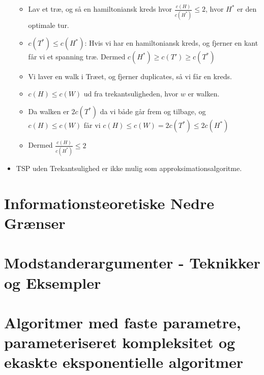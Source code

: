 \begin{itemize}
\begin{itemize}
		      \item Lav et træ, og så en hamiltoniansk kreds hvor $\frac{c(H)}{c(H^{*})} \le 2$, hvor $H^{*}$ er den optimale tur.
		      \item $c(T^{*}) \le c(H^{*})$: Hvis vi har en hamiltoniansk kreds, og fjerner en kant får vi et spanning træ. Dermed $c(H^{*}) \ge c(T') \ge c(T^{*})$
		      \item Vi laver en walk i Træet, og fjerner duplicates, så vi får en kreds.
		      \item $c(H) \le c(W)$ ud fra trekantsuligheden, hvor $w$ er walken.
		      \item Da walken er $2c(T^{*})$ da vi både går frem og tilbage, og $c(H) \le c(W)$ får vi $c(H) \le c(W) = 2c(T^{*}) \le 2c(H^{*})$
		      \item Dermed $\frac{c(H)}{c(H^{*})} \le 2$
	      \end{itemize}
	\item TSP  uden Trekantsulighed er ikke mulig som approksimationsalgoritme.
\end{itemize}

\section*{Informationsteoretiske Nedre Grænser}

\section*{Modstanderargumenter - Teknikker og Eksempler}

\section*{Algoritmer med faste parametre, parameteriseret kompleksitet og ekaskte eksponentielle algoritmer}


\newpage


